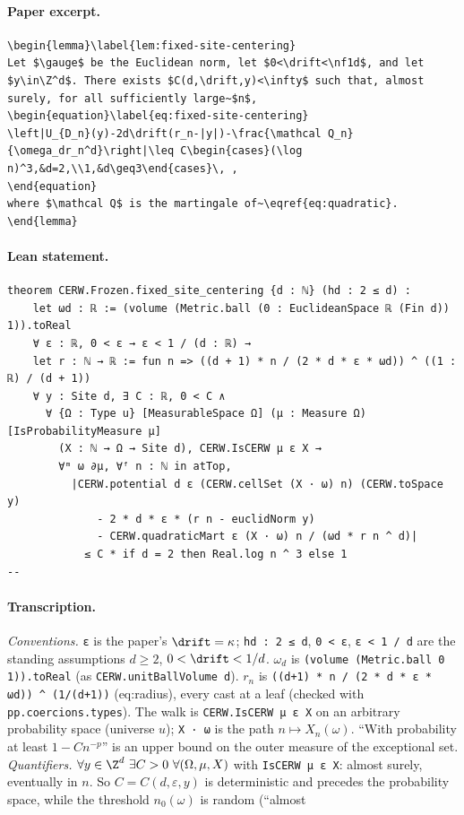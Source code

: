 \paragraph{Paper excerpt.}
\begin{verbatim}
\begin{lemma}\label{lem:fixed-site-centering}
Let $\gauge$ be the Euclidean norm, let $0<\drift<\nf1d$, and let $y\in\Z^d$. There exists $C(d,\drift,y)<\infty$ such that, almost surely, for all sufficiently large~$n$,
\begin{equation}\label{eq:fixed-site-centering}
\left|U_{D_n}(y)-2d\drift(r_n-|y|)-\frac{\mathcal Q_n}{\omega_dr_n^d}\right|\leq C\begin{cases}(\log n)^3,&d=2,\\1,&d\geq3\end{cases}\, ,
\end{equation}
where $\mathcal Q$ is the martingale of~\eqref{eq:quadratic}.
\end{lemma}
\end{verbatim}
\paragraph{Lean statement.}
\begin{verbatim}
theorem CERW.Frozen.fixed_site_centering {d : ℕ} (hd : 2 ≤ d) :
    let ωd : ℝ := (volume (Metric.ball (0 : EuclideanSpace ℝ (Fin d)) 1)).toReal
    ∀ ε : ℝ, 0 < ε → ε < 1 / (d : ℝ) →
    let r : ℕ → ℝ := fun n => ((d + 1) * n / (2 * d * ε * ωd)) ^ ((1 : ℝ) / (d + 1))
    ∀ y : Site d, ∃ C : ℝ, 0 < C ∧
      ∀ {Ω : Type u} [MeasurableSpace Ω] (μ : Measure Ω) [IsProbabilityMeasure μ]
        (X : ℕ → Ω → Site d), CERW.IsCERW μ ε X →
        ∀ᵐ ω ∂μ, ∀ᶠ n : ℕ in atTop,
          |CERW.potential d ε (CERW.cellSet (X · ω) n) (CERW.toSpace y)
              - 2 * d * ε * (r n - euclidNorm y)
              - CERW.quadraticMart ε (X · ω) n / (ωd * r n ^ d)|
            ≤ C * if d = 2 then Real.log n ^ 3 else 1
--
\end{verbatim}
\paragraph{Transcription.}
\emph{Conventions.} \verb!ε! is the paper's $\drift=\kappa$; \verb!hd : 2 ≤ d!, \verb!0 < ε!, \verb!ε < 1 / d! are the standing assumptions $d\ge2$, $0<\drift<1/d$. $\omega_d$ is \verb!(volume (Metric.ball 0 1)).toReal! (as \verb!CERW.unitBallVolume d!). $r_n$ is \verb!((d+1) * n / (2 * d * ε * ωd)) ^ (1/(d+1))! (eq:radius), every cast at a leaf (checked with \verb!pp.coercions.types!). The walk is \verb!CERW.IsCERW μ ε X! on an arbitrary probability space (universe $u$); \verb!X · ω! is the path $n\mapsto X_n(\omega)$. ``With probability at least $1-Cn^{-p}$'' is an upper bound on the outer measure of the exceptional set. \emph{Quantifiers.} $\forall y\in\Z^d\ \exists C>0\ \forall(\Omega,\mu,X)$ with \verb!IsCERW μ ε X!: almost surely, eventually in $n$. So $C=C(d,\varepsilon,y)$ is deterministic and precedes the probability space, while the threshold $n_0(\omega)$ is random (``almost
